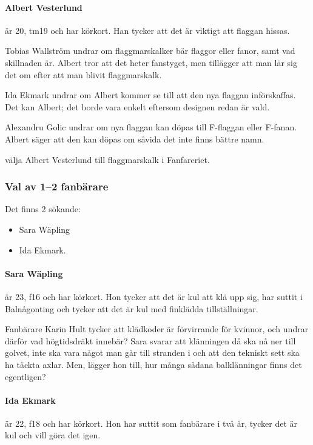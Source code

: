 \documentclass[hidelinks]{sektionsmote}
\begin{document}
\paragraph{Albert Vesterlund} är 20, tm19 och har körkort.
Han tycker att det är viktigt att flaggan hissas.

Tobias Wallström undrar om flaggmarskalker bär flaggor eller fanor, samt vad skillnaden är.
Albert tror att det heter fanstyget, men tillägger att man lär sig det om efter att man blivit flaggmarskalk.

Ida Ekmark undrar om Albert kommer se till att den nya flaggan införskaffas.
Det kan Albert; det borde vara enkelt eftersom designen redan är vald.

Alexandru Golic undrar om nya flaggan kan döpas till F-flaggan eller F-fanan.
Albert säger att den kan döpas om såvida det inte finns bättre namn.

\begin{beslut}
  \item välja Albert Vesterlund till flaggmarskalk i Fanfareriet.
\end{beslut}


\subsubsection{Val av 1--2 fanbärare}
Det finns 2 sökande:
\begin{itemize}
    \item Sara Wäpling
    \item Ida Ekmark.
\end{itemize}

\paragraph{Sara Wäpling} är 23, f16 och har körkort.
Hon tycker att det är kul att klä upp sig, har suttit i Balnågonting och tycker att det är kul med finklädda tillställningar.

Fanbärare Karin Hult tycker att klädkoder är förvirrande för kvinnor, och undrar därför vad högtidsdräkt innebär?
Sara svarar att klänningen då ska nå ner till golvet, inte ska vara något man går till stranden i och att den tekniskt sett ska ha täckta axlar.
Men, lägger hon till, hur många sådana balklänningar finns det egentligen?

\paragraph{Ida Ekmark} är 22, f18 och har körkort.
Hon har suttit som fanbärare i två år, tycker det är kul och vill göra det igen.
\end{document}
